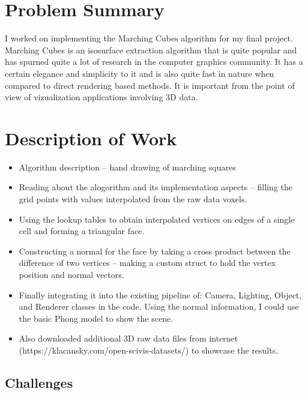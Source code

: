 \hypertarget{problem-summary}{%
\section{Problem Summary}\label{problem-summary}}

I worked on implementing the Marching Cubes algorithm for my final
project. Marching Cubes is an isosurface extraction algorithm that is
quite popular and has spurned quite a lot of research in the computer
graphics community. It has a certain elegance and simplicity to it and
is also quite fast in nature when compared to direct rendering based
methods. It is important from the point of view of vizualization
applications involving 3D data.

\hypertarget{description-of-work}{%
\section{Description of Work}\label{description-of-work}}

\begin{itemize}
\tightlist
\item
  Algorithm description -- hand drawing of marching squares
\item
  Reading about the alogorithm and its implementation aspects -- filling
  the grid points with values interpolated from the raw data voxels.
\item
  Using the lookup tables to obtain interpolated vertices on edges of a
  single cell and forming a triangular face.
\item
  Constructing a normal for the face by taking a cross product between
  the difference of two vertices -- making a custom struct to hold the
  vertex position and normal vectors.
\item
  Finally integrating it into the existing pipeline of: Camera,
  Lighting, Object, and Renderer classes in the code. Using the normal
  information, I could use the basic Phong model to show the scene.
\item
  Also downloaded additional 3D raw data files from internet
  (https://klacansky.com/open-scivis-datasets/) to showcase the results.
\end{itemize}

\hypertarget{challenges}{%
\subsection{Challenges}\label{challenges}}

